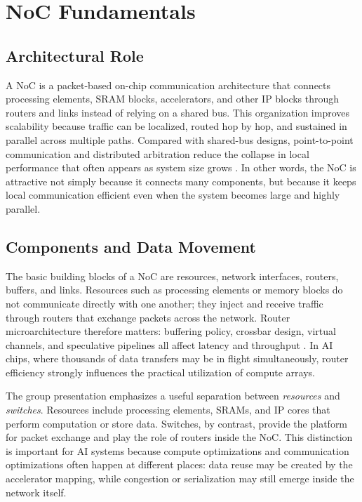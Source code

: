\section{NoC Fundamentals}
\label{sec:fundamentals}

\subsection{Architectural Role}

A NoC is a packet-based on-chip communication architecture that connects processing elements, SRAM blocks, accelerators, and other IP blocks through routers and links instead of relying on a shared bus. This organization improves scalability because traffic can be localized, routed hop by hop, and sustained in parallel across multiple paths. Compared with shared-bus designs, point-to-point communication and distributed arbitration reduce the collapse in local performance that often appears as system size grows \cite{dally2001route,bjerregaard2006survey}. In other words, the NoC is attractive not simply because it connects many components, but because it keeps local communication efficient even when the system becomes large and highly parallel.

\subsection{Components and Data Movement}

The basic building blocks of a NoC are resources, network interfaces, routers, buffers, and links. Resources such as processing elements or memory blocks do not communicate directly with one another; they inject and receive traffic through routers that exchange packets across the network. Router microarchitecture therefore matters: buffering policy, crossbar design, virtual channels, and speculative pipelines all affect latency and throughput \cite{peh2001delay}. In AI chips, where thousands of data transfers may be in flight simultaneously, router efficiency strongly influences the practical utilization of compute arrays.

The group presentation emphasizes a useful separation between \emph{resources} and \emph{switches}. Resources include processing elements, SRAMs, and IP cores that perform computation or store data. Switches, by contrast, provide the platform for packet exchange and play the role of routers inside the NoC. This distinction is important for AI systems because compute optimizations and communication optimizations often happen at different places: data reuse may be created by the accelerator mapping, while congestion or serialization may still emerge inside the network itself.


